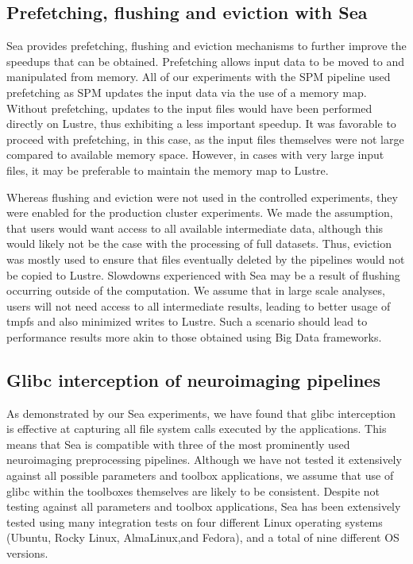 \documentclass[pdflatex,sn-mathphys-num]{sn-jnl}
\theoremstyle{thmstyleone}%
\theoremstyle{thmstyletwo}%
\theoremstyle{thmstylethree}%
\begin{document}
    \subsection{Prefetching, flushing and eviction with Sea}

    Sea provides prefetching, flushing and eviction mechanisms to further
    improve the speedups that can be obtained. Prefetching allows input data to
    be moved to and manipulated from memory. All of our experiments with the SPM pipeline
    used prefetching as SPM updates the input data via the use of a memory map.
    Without prefetching, updates to the input files would have been performed
    directly on Lustre, thus exhibiting a less important speedup. It was
    favorable to proceed with prefetching, in this case, as the input files
    themselves were not large compared to available memory space. However, in
    cases with very large input files, it may be preferable to maintain the
    memory map to Lustre.

    Whereas flushing and eviction were not used in the controlled experiments,
    they were enabled for the production cluster experiments. We made the assumption, that
    users would want access to all available intermediate data, although this
    would likely not be the case with the processing of full datasets. Thus,
    eviction was mostly used to ensure that files eventually deleted by the
    pipelines would not be copied to Lustre. Slowdowns experienced with Sea may
    be a result of flushing occurring outside of the computation. We assume that
    in large scale analyses, users will not need access to all intermediate
    results, leading to better usage of tmpfs and also minimized writes to
    Lustre. Such a scenario should lead to performance results more akin to
    those obtained using Big Data frameworks.

    \subsection{Glibc interception of neuroimaging pipelines}
    
    As demonstrated by our Sea experiments, we have found that glibc interception
    is effective at capturing all file system calls executed by the
    applications. This means that Sea is compatible with three of the most
    prominently used neuroimaging preprocessing pipelines. Although we have not
    tested it extensively against all possible parameters and toolbox
    applications, we assume that use of glibc within the toolboxes themselves are
    likely to be consistent. Despite not testing against all parameters and
    toolbox applications, Sea has been extensively tested using many integration
    tests on four different Linux operating systems (Ubuntu, Rocky Linux, AlmaLinux,and Fedora),
    and a total of nine different OS versions.
\end{document}
